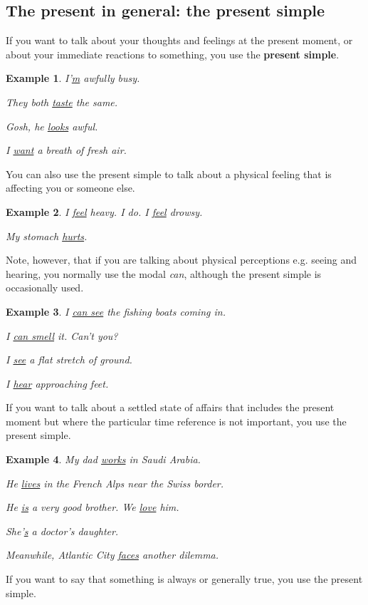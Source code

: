 \documentclass[oneside]{book}
\numberwithin{equation}{section}
\newtheorem{example}{Example}[section]
\begin{document}
\subsection{The present in general: the present simple}
\noindent{} If you want to talk about your thoughts and feelings at the present moment, or about your immediate reactions to something, you use the \textbf{present simple}.
\begin{example}
    I'\underline{m} awfully busy.
    
    They both \underline{taste} the same.
    
    Gosh, he \underline{looks} awful.
    
    I \underline{want} a breath of fresh air.
\end{example}
You can also use the present simple to talk about a physical feeling that is affecting you or someone else.
\begin{example}
    I \underline{feel} heavy. I do. I \underline{feel} drowsy.
    
    My stomach \underline{hurts}.
\end{example}
Note, however, that if you are talking about physical perceptions e.g. seeing and hearing, you normally use the modal \textit{can}, although the present simple is occasionally used.
\begin{example}
    I \underline{can see} the fishing boats coming in.
    
    I \underline{can smell} it. Can't you?
    
    I \underline{see} a flat stretch of ground.
    
    I \underline{hear} approaching feet.
\end{example}
%
\noindent{} If you want to talk about a settled state of affairs that includes the present moment but where the particular time reference is not important, you use the present simple.
\begin{example}
    My dad \underline{works} in Saudi Arabia.
    
    He \underline{lives} in the French Alps near the Swiss border.
    
    He \underline{is} a very good brother. We \underline{love} him.
    
    She'\underline{s} a doctor's daughter.
    
    Meanwhile, Atlantic City \underline{faces} another dilemma.
\end{example}
%
\noindent{} If you want to say that something is always or generally true, you use the present simple.
\end{document}
